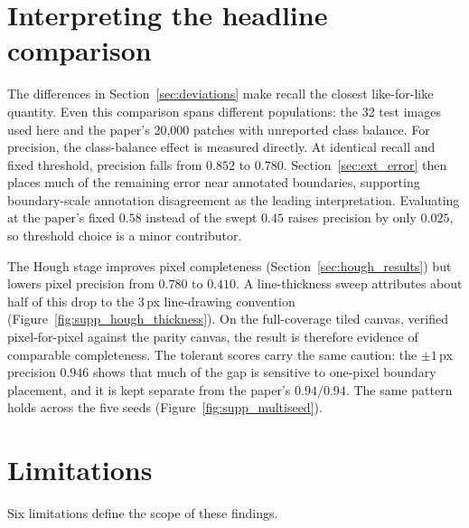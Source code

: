 \documentclass{cam-thesis}
\begin{document}
\section{Interpreting the headline comparison}
\label{sec:interpretation}

The differences in Section~\ref{sec:deviations} make recall the closest
like-for-like quantity. Even this comparison spans different populations: the
32 test images used here and the paper's 20{,}000 patches with unreported class
balance. For precision, the class-balance effect is measured directly. At
identical recall and fixed threshold, precision falls from $0.852$ to $0.780$.
Section~\ref{sec:ext_error} then places much of the remaining error near
annotated boundaries, supporting boundary-scale annotation disagreement as the
leading interpretation. Evaluating at the paper's fixed $0.58$ instead of the
swept $0.45$ raises precision by only $0.025$, so threshold choice is a minor
contributor.

The Hough stage improves pixel completeness (Section~\ref{sec:hough_results})
but lowers pixel precision from $0.780$ to $0.410$. A line-thickness sweep
attributes about half of this drop to the $3$\,px line-drawing convention
(Figure~\ref{fig:supp_hough_thickness}). On the full-coverage tiled canvas,
verified pixel-for-pixel against the parity canvas, the result is therefore
evidence of comparable completeness. The tolerant scores carry the same caution:
the $\pm1$\,px precision $0.946$ shows that much of the gap is sensitive to
one-pixel boundary placement, and it is kept separate from the paper's
$0.94/0.94$. The same pattern holds across the five seeds
(Figure~\ref{fig:supp_multiseed}).

\section{Limitations}
\label{sec:limitations}

Six limitations define the scope of these findings.
\end{document}
